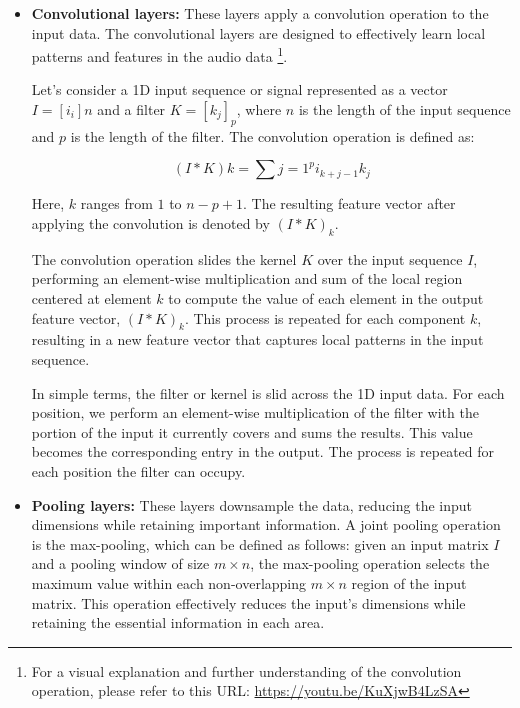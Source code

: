 \begin{itemize}

\item \textbf{Convolutional layers:} These layers apply a convolution operation to the input data. The convolutional layers are designed to effectively learn local patterns and features in the audio data \footnote{For a visual explanation and further understanding of the convolution operation, please refer to this URL: \url{https://youtu.be/KuXjwB4LzSA}}.

Let's consider a 1D input sequence or signal represented as a vector $I = [i_{i}]{n}$ and a filter $K = [k_{j}]_{p}$, where $n$ is the length of the input sequence and $p$ is the length of the filter. The convolution operation is defined as:

\begin{equation}
(I * K){k} = \sum{j=1}^{p} i_{k+j-1}k_{j}
\end{equation}

Here, $k$ ranges from $1$ to $n-p+1$. The resulting feature vector after applying the convolution is denoted by $(I * K)_{k}$.

The convolution operation slides the kernel $K$ over the input sequence $I$, performing an element-wise multiplication and sum of the local region centered at element $k$ to compute the value of each element in the output feature vector, $(I * K)_{k}$. This process is repeated for each component $k$, resulting in a new feature vector that captures local patterns in the input sequence.

In simple terms, the filter or kernel is slid across the 1D input data. For each position, we perform an element-wise multiplication of the filter with the portion of the input it currently covers and sums the results. This value becomes the corresponding entry in the output. The process is repeated for each position the filter can occupy.

\item \textbf{Pooling layers:} These layers downsample the data, reducing the input dimensions while retaining important information. A joint pooling operation is the max-pooling, which can be defined as follows: given an input matrix $I$ and a pooling window of size $m \times n$, the max-pooling operation selects the maximum value within each non-overlapping $m \times n$ region of the input matrix. This operation effectively reduces the input's dimensions while retaining the essential information in each area.
\vspace*{3mm}


\end{itemize}
